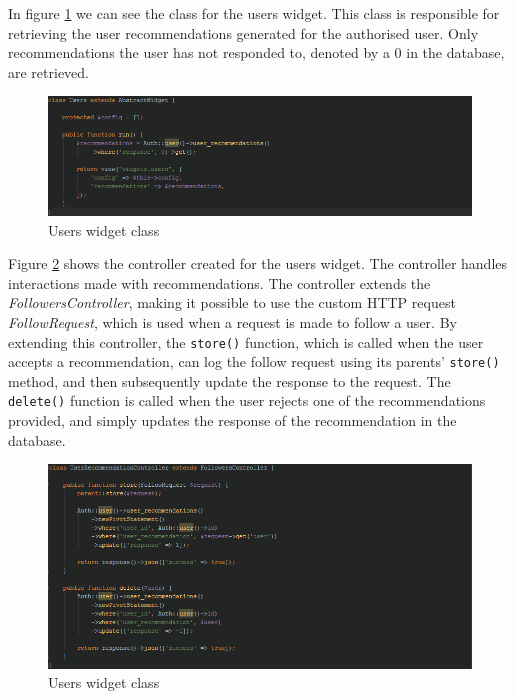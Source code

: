 In figure \ref{fig:UsersWidget} we can see the class for the users widget. This class is responsible for retrieving the user recommendations generated for the authorised user. Only recommendations the user has not responded to, denoted by a 0 in the database, are retrieved. 

\begin{figure}[H]
\centering
\includegraphics[width=1\textwidth]{Images/Implementation/UsersWidget}
\caption{Users widget class}
\label{fig:UsersWidget}
\end{figure}

Figure \ref{fig:UserRecommendationsController} shows the controller created for the users widget. The controller handles interactions made with recommendations. The controller extends the \textit{FollowersController}, making it possible to use the custom HTTP request \textit{FollowRequest}, which is used when a request is made to follow a user. By extending this controller, the \texttt{store()} function, which is called when the user accepts a recommendation, can log the follow request using its parents' \texttt{store()} method, and then subsequently update the response to the request. The \texttt{delete()} function is called when the user rejects one of the recommendations provided, and simply updates the response of the recommendation in the database.

\begin{figure}[H]
\centering
\includegraphics[width=1\textwidth]{Images/Implementation/UserRecommendationsController}
\caption{Users widget class}
\label{fig:UserRecommendationsController}
\end{figure}


